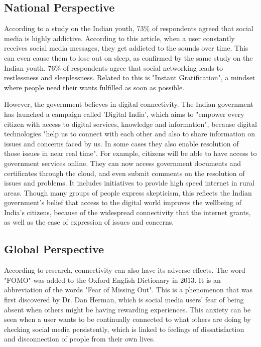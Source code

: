 \documentclass[a4paper, 11pt]{article}
\begin{document}
    \subsection{National Perspective}
      According to a study on the Indian youth, 73\% of respondents agreed that social media is highly addictive.\cite{indian-youth-study} According to this article, when a user constantly receives social media messages, they get addicted to the sounds over time. \cite{your-gadgets-are-robbing-you-of-your-sleep} This can even cause them to lose out on sleep, as confirmed by the same study on the Indian youth. 76\% of respondents agree that social networking leads to restlessness and sleeplessness. Related to this is "Instant Gratification", a mindset where people need their wants fulfilled as soon as possible. \cite{instant-grat, instant-grat-india}

      However, the government believes in digital connectivity. The Indian government has launched a campaign called 'Digital India', which aims to "empower every citizen with access to digital services, knowledge and information", because digital technologies "help us to connect with each other and also to share information on issues and concerns faced by us. In some cases they also enable resolution of those issues in near real time".\cite{digital-india-gov} For example, citizens will be able to have access to government services online. They can now access government documents and certificates through the cloud, and even submit comments on the resolution of issues and problems. It includes initiatives to provide high speed internet in rural areas. Though many groups of people express skepticism, this reflects the Indian government's belief that access to the digital world improves the wellbeing of India's citizens, because of the widespread connectivity that the internet grants, as well as the ease of expression of issues and concerns. \cite{digital-india-thehindu, digital-india-thehindu-2}

    \subsection{Global Perspective}
      According to research, connectivity can also have its adverse effects. The word "FOMO" was added to the Oxford English Dictionary in 2013. It is an abbreviation of the words "Fear of Missing Out". This is a phenomenon that was first discovered by Dr. Dan Herman, which is social media users' fear of being absent when others might be having rewarding experiences.\cite{wikipedia-fomo} This anxiety can be seen when a user wants to be continually connected to what others are doing by checking social media persistently, which is linked to feelings of dissatisfaction and disconnection of people from their own lives.\cite{fomo-science}
\end{document}
